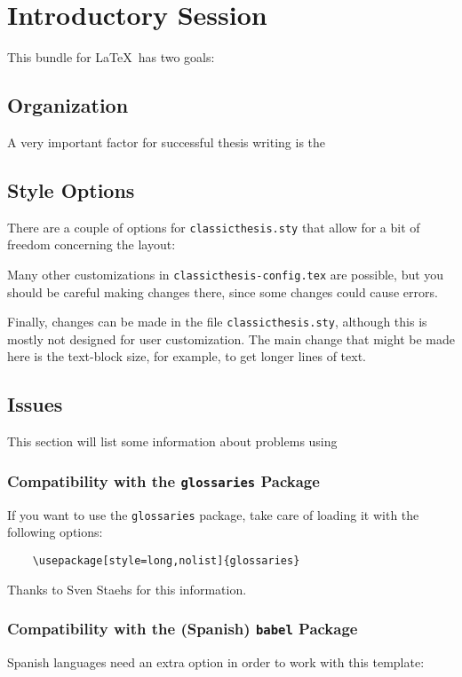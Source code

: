 \chapter{Introductory Session}\label{ch:introduction}
This bundle for \LaTeX\ has two goals:
\Bart

\section{Organization}
A very important factor for successful thesis writing is the


\section{Style Options}\label{sec:options}
There are a couple of options for \texttt{classicthesis.sty} that
allow for a bit of freedom concerning the layout:

Many other customizations in \texttt{classicthesis-config.tex} are
possible, but you should be careful making changes there, since some
changes could cause errors.

Finally, changes can be made in the file \texttt{classicthesis.sty},%
 although this is mostly not designed for user customization. The
main change that might be made here is the text-block size, for example,
to get longer lines of text.


\section{Issues}\label{sec:issues}
This section will list some information about problems using

\subsection*{Compatibility with the \texttt{glossaries} Package}
If you want to use the \texttt{glossaries} package, take care of loading it 
with the following options:
\begin{verbatim}
	\usepackage[style=long,nolist]{glossaries}
\end{verbatim}
Thanks to Sven Staehs for this information. 


\subsection*{Compatibility with the (Spanish) \texttt{babel} Package}
Spanish languages need an extra option in order to work with this template:


